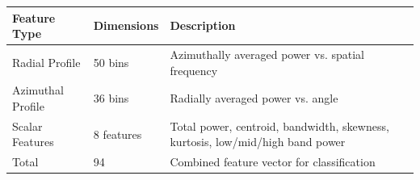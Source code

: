 \begin{tabular}{lll}
\toprule
Feature Type & Dimensions & Description \\
\midrule
Radial Profile & 50 bins & Azimuthally averaged power vs. spatial frequency \\
Azimuthal Profile & 36 bins & Radially averaged power vs. angle \\
Scalar Features & 8 features & Total power, centroid, bandwidth, skewness, kurtosis, low/mid/high band power \\
Total & 94 & Combined feature vector for classification \\
\bottomrule
\end{tabular}
